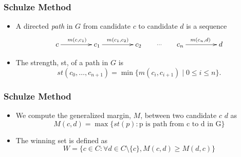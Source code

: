 \documentclass{beamer}
\begin{document}
\begin{frame}
\frametitle{Schulze Method}
\begin{itemize}

\item A directed \emph{path} in $G$ from
candidate $c$ to candidate $d$ is a sequence 
 \[\xymatrix@C=10ex{ c  \ar[r]^{m(c, c_1)} & c_1   \ar[r]^{m(c_1,c_2)} & c_2 \ar@{}[r]|{\dots} & c_{n}   \ar[r]^{m(c_{n}, d)} & d } \]

\item The strength, st, of a path in $G$ is
\[ st(c_0, \dots, c_{n+1}) = \min \lbrace m (c_i, c_{i+1}) \mid 0
\leq i \leq n \rbrace. \]
%
%

\end{itemize}
\end{frame}

\begin{frame}
\frametitle{Schulze Method}
\begin{itemize}
\item We compute the generalized margin, $M$, between two candidate $c$ $d$ as 
  	\[ M(c, d) = \max \lbrace st (p) : \text{p is path from c to d in G} \rbrace\]
 
 \item  	The winning set is defined as 
 \[ W =  \lbrace c \in C : \forall d \in C \setminus \{c\}, M (c, d) \geq M (d, c) \rbrace\]


\end{itemize}
\end{frame}
\end{document}

